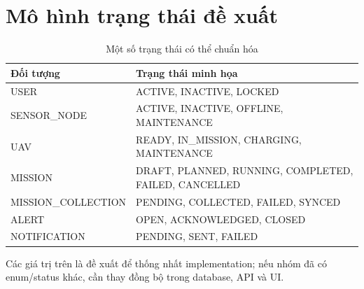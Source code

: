 \section{Mô hình trạng thái đề xuất}
\begin{table}[H]
\centering
\caption{Một số trạng thái có thể chuẩn hóa}
\label{tab:states}
\begin{tabularx}{\textwidth}{lY}
\toprule
Đối tượng & Trạng thái minh họa \\
\midrule
USER & ACTIVE, INACTIVE, LOCKED\\
SENSOR\_NODE & ACTIVE, INACTIVE, OFFLINE, MAINTENANCE\\
UAV & READY, IN\_MISSION, CHARGING, MAINTENANCE\\
MISSION & DRAFT, PLANNED, RUNNING, COMPLETED, FAILED, CANCELLED\\
MISSION\_COLLECTION & PENDING, COLLECTED, FAILED, SYNCED\\
ALERT & OPEN, ACKNOWLEDGED, CLOSED\\
NOTIFICATION & PENDING, SENT, FAILED\\
\bottomrule
\end{tabularx}
\end{table}
Các giá trị trên là đề xuất để thống nhất implementation; nếu nhóm đã có enum/status khác, cần thay đồng bộ trong database, API và UI.

